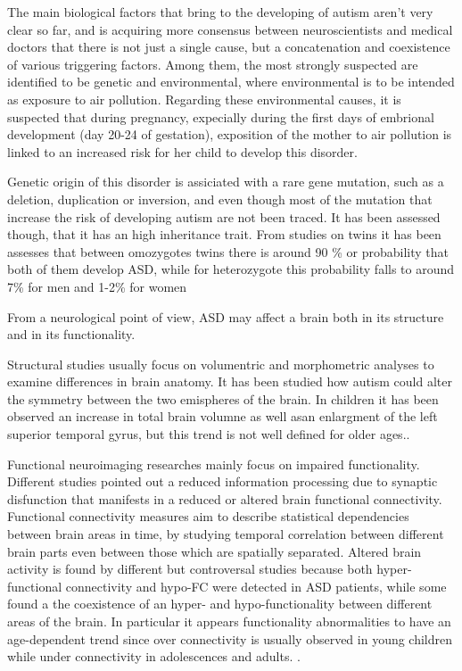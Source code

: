 \documentclass[11pt]{report}
\begin{document}
The main biological factors that bring to the developing of autism aren't very clear so far, and is acquiring more consensus between neuroscientists and medical doctors that there is not just a single cause, but a concatenation and coexistence of various triggering factors.
Among them, the most strongly suspected are identified to be genetic and environmental, where environmental is to be intended as exposure to air pollution.
Regarding these environmental causes, it is suspected that during pregnancy, expecially during the first days of embrional development (day 20-24 of gestation), exposition of the mother to air pollution is linked to an increased risk for her child to develop this disorder.\cite{ratajczak-2011}

Genetic origin of this disorder is assiciated with a rare gene mutation, such as a deletion, duplication or inversion, and even though most of the mutation that increase the risk of developing autism are not been traced.
It has been assessed though, that it has an high inheritance trait. From studies on twins it has been assesses that between omozygotes twins there is around 90 \% or probability that both of them develop ASD, while for heterozygote this probability falls to around 7\% for men and 1-2\% for women
\cite{freitag-2007}

From a neurological point of view, ASD may affect a brain both in its structure and in its functionality.

Structural studies usually focus on volumentric and morphometric analyses to examine differences in brain anatomy.
It has been studied how autism could alter the symmetry between the two emispheres \cite{postema2019} of the brain. In children it has been observed an increase in total brain volumne as well asan enlargment of the left superior temporal gyrus, but this trend is not well defined for older ages.\cite{riddle-2017}.


Functional neuroimaging researches mainly focus on impaired functionality. Different studies pointed out a reduced information processing due to synaptic disfunction that manifests in a reduced or altered brain functional connectivity.
Functional connectivity measures aim to describe statistical dependencies between brain areas in time, by studying temporal correlation between different brain parts even between those which are spatially separated.
Altered brain activity is found by different but controversal studies because both hyper- functional connectivity and hypo-FC were detected in ASD patients, while some found a the coexistence of an hyper- and hypo-functionality between different areas of the brain.
In particular it appears functionality abnormalities to have an age-dependent trend since over connectivity is usually observed in young children while under connectivity in adolescences and adults.\cite{supekar-2013} \cite{spera-2019}.
\end{document}
